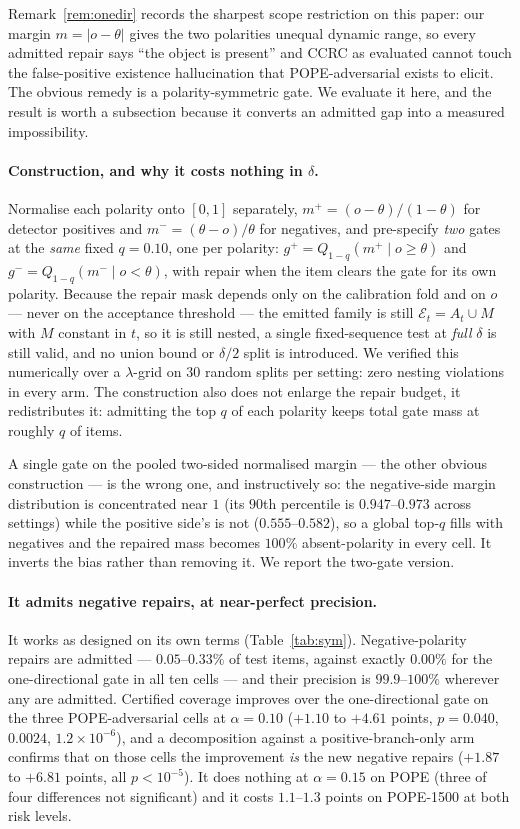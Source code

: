 \documentclass[review,number,doubleblind]{elsarticle}
\theoremstyle{plain}
\theoremstyle{definition}
\theoremstyle{remark}
\newcommand{\emit}{\mathcal{E}}
\begin{document}
Remark~\ref{rem:onedir} records the sharpest scope restriction on this paper: our margin
$m=|o-\theta|$ gives the two polarities unequal dynamic range, so every admitted repair says
``the object is present'' and CCRC as evaluated cannot touch the false-positive existence
hallucination that POPE-adversarial exists to elicit. The obvious remedy is a polarity-symmetric
gate. We evaluate it here, and the result is worth a subsection because it converts an admitted
gap into a measured impossibility.

\paragraph{Construction, and why it costs nothing in $\delta$.}
Normalise each polarity onto $[0,1]$ separately, $m^+=(o-\theta)/(1-\theta)$ for detector
positives and $m^-=(\theta-o)/\theta$ for negatives, and pre-specify \emph{two} gates at the
\emph{same} fixed $q=0.10$, one per polarity:
$g^+=Q_{1-q}(m^+\mid o\ge\theta)$ and $g^-=Q_{1-q}(m^-\mid o<\theta)$, with repair when the
item clears the gate for its own polarity. Because the repair mask depends only on the
calibration fold and on $o$ --- never on the acceptance threshold --- the emitted family is
still $\emit_t=A_t\cup M$ with $M$ constant in $t$, so it is still nested, a single
fixed-sequence test at \emph{full} $\delta$ is still valid, and no union bound or $\delta/2$
split is introduced. We verified this numerically over a $\lambda$-grid on $30$ random splits
per setting: zero nesting violations in every arm. The construction also does not enlarge the
repair budget, it redistributes it: admitting the top $q$ of each polarity keeps total gate mass
at roughly $q$ of items.

A single gate on the pooled two-sided normalised margin --- the other obvious construction ---
is the wrong one, and instructively so: the negative-side margin distribution is concentrated
near $1$ (its $90$th percentile is $0.947$--$0.973$ across settings) while the positive side's is
not ($0.555$--$0.582$), so a global top-$q$ fills with negatives and the repaired mass becomes
$100\%$ absent-polarity in every cell. It inverts the bias rather than removing it. We report the
two-gate version.

\paragraph{It admits negative repairs, at near-perfect precision.}
It works as designed on its own terms (Table~\ref{tab:sym}). Negative-polarity repairs are
admitted --- $0.05$--$0.33\%$ of test items, against exactly $0.00\%$ for the one-directional
gate in all ten cells --- and their precision is $99.9$--$100\%$ wherever any are admitted.
Certified coverage improves over the one-directional gate on the three POPE-adversarial cells at
$\alpha=0.10$ ($+1.10$ to $+4.61$ points, $p=0.040$, $0.0024$, $1.2\times10^{-6}$), and a
decomposition against a positive-branch-only arm confirms that on those cells the improvement
\emph{is} the new negative repairs ($+1.87$ to $+6.81$ points, all $p<10^{-5}$). It does nothing
at $\alpha=0.15$ on POPE (three of four differences not significant) and it costs $1.1$--$1.3$
points on POPE-1500 at both risk levels.
\end{document}
